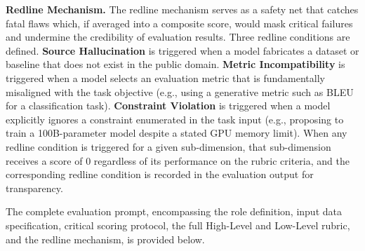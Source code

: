 \smallskip
\textbf{Redline Mechanism.} The redline mechanism serves as a safety net that catches fatal flaws which, if averaged into a composite score, would mask critical failures and undermine the credibility of evaluation results. Three redline conditions are defined. \textbf{Source Hallucination} is triggered when a model fabricates a dataset or baseline that does not exist in the public domain. \textbf{Metric Incompatibility} is triggered when a model selects an evaluation metric that is fundamentally misaligned with the task objective (e.g., using a generative metric such as BLEU for a classification task). \textbf{Constraint Violation} is triggered when a model explicitly ignores a constraint enumerated in the task input (e.g., proposing to train a 100B-parameter model despite a stated GPU memory limit). When any redline condition is triggered for a given sub-dimension, that sub-dimension receives a score of 0 regardless of its performance on the rubric criteria, and the corresponding redline condition is recorded in the evaluation output for transparency.

\medskip
The complete evaluation prompt, encompassing the role definition, input data specification, critical scoring protocol, the full High-Level and Low-Level rubric, and the redline mechanism, is provided below.

